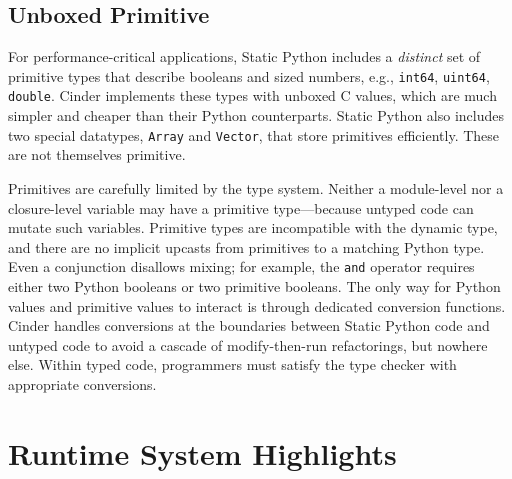 \documentclass[english,cleveref,submission]{programming}
\newcommand{\SP}{Static Python}
\newcommand{\code}[1]{\texttt{#1}}
\begin{document}
\subsection{Unboxed Primitive}
\label{s:c-types}


For performance-critical applications, \SP{} includes a \emph{distinct} set of primitive types
that describe booleans and sized numbers, e.g., \code{int64}, \code{uint64}, \code{double}.
Cinder implements these types with unboxed C values, which are much simpler and cheaper
than their Python counterparts.
\SP{} also includes two special datatypes, \code{Array} and \code{Vector}, that store primitives efficiently.
These are not themselves primitive.

Primitives are carefully limited by the type system.
Neither a module-level nor a closure-level variable may have a primitive
type---because untyped code can mutate such variables.
Primitive types are incompatible with the dynamic type,
and there are no implicit upcasts from primitives
to a matching Python type.
Even a conjunction disallows mixing; for example, the \code{and} operator
requires either two Python booleans or two primitive booleans.
The only way for Python values and primitive values to interact
is through dedicated conversion functions.
Cinder handles conversions at the boundaries between \SP{} code
and untyped code to avoid a cascade of modify-then-run refactorings, but nowhere else.
Within typed code, programmers must satisfy the type checker with
appropriate conversions.






\section{Runtime System Highlights}
\label{s:runtime}
\end{document}
